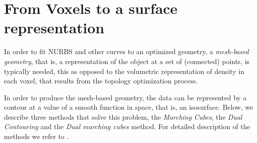 \section{From Voxels to a surface representation}
\label{sec:surfaceBackg}
In order to fit NURBS and other curves to an optimized geometry, a \emph{mesh-based geometry}, that is, a representation of the object at a set of (connected) points, is typically needed, this as opposed to the volumetric representation of density in each voxel, that results from the topology optimization process. 

In order to produce the mesh-based geometry, the data can be represented by a contour at a value of a smooth function in space, that is, an isosurface. Below, we describe three methods that solve this problem, the \emph{Marching Cubes}, the \emph{Dual Contouring} and the \emph{Dual marching cubes} method. For detailed description of the methods we refer to .





